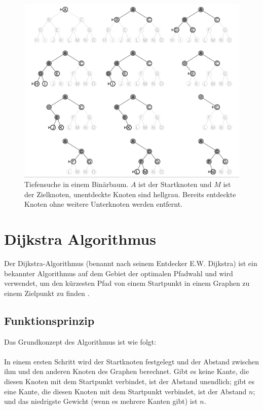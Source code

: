 \begin{figure}[H]
	\centering
	\includegraphics[width=1.0\textwidth]{images/tiefensuche.png}
	\caption{Tiefensuche in einem Binärbaum. $A$ ist der Startknoten und $M$ ist der Zielknoten, unentdeckte Knoten sind hellgrau. 
		Bereits entdeckte Knoten ohne weitere Unterknoten werden entfernt.}
	\label{fig:Tiefensuche}
\end{figure}

\section{Dijkstra Algorithmus}
\label{Dijkstra Algorithmus}

Der Dijkstra-Algorithmus (benannt nach seinem Entdecker E.W. Dijkstra) ist ein bekannter Algorithmus auf dem Gebiet der optimalen
Pfadwahl und wird verwendet, um den kürzesten Pfad von einem Startpunkt in einem Graphen zu einem Zielpunkt zu finden \cite{Javaid2019}.

\subsection{Funktionsprinzip}

Das Grundkonzept des Algorithmus ist wie folgt:
\\ \\
In einem ersten Schritt wird der Startknoten festgelegt und der Abstand zwischen ihm und den anderen Knoten des Graphen berechnet. 
Gibt es keine Kante, die diesen Knoten mit dem Startpunkt verbindet, ist der Abstand unendlich; gibt es eine Kante, die 
diesen Knoten mit dem Startpunkt verbindet, ist der Abstand $n$; und das niedrigste Gewicht (wenn es mehrere Kanten gibt) ist $n$.


